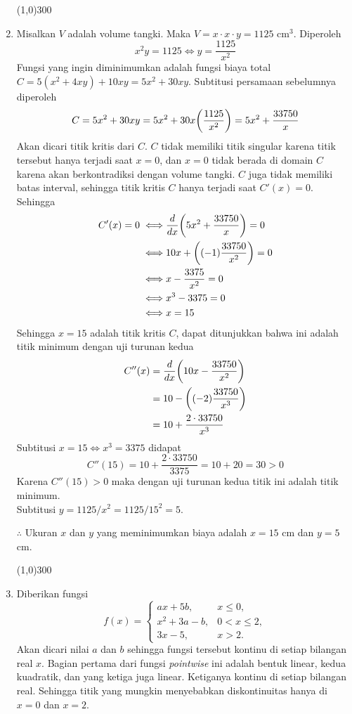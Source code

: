 \begin{enumerate}[leftmargin=*, label={\arabic*}.]
\begin{center}
    \line(1,0){300}
\end{center}
\item Misalkan $V$ adalah volume tangki. Maka $V = x \cdot x \cdot y = 1125$ cm$^{3}$.
Diperoleh
\[
x^{2}y = 1125 \iff y = \frac{1125}{x^{2}}
\]
Fungsi yang ingin diminimumkan adalah fungsi biaya total 
$C = 5(x^{2}+4xy)+10xy=5x^{2}+30xy$. Subtitusi persamaan sebelumnya diperoleh
\[
C = 5x^{2}+30xy = 5x^{2}+30x\brk*{\frac{1125}{x^{2}}} = 5x^{2}+\frac{33750}{x}
\]
Akan dicari titik kritis dari $C$. $C$ tidak memiliki titik singular karena titik 
tersebut hanya terjadi saat $x = 0$, dan $x=0$ tidak berada di domain $C$ karena akan 
berkontradiksi dengan volume tangki. $C$ juga tidak memiliki batas interval, sehingga titik 
kritis $C$ hanya terjadi saat $C'(x)=0$.
Sehingga
\begin{align*}
    C'(x) = 0 \iff &\drv{x}{5x^{2}+\frac{33750}{x}} = 0\\
    \iff & 10x+\brk*{(-1)\frac{33750}{x^{2}}} = 0\\
    \iff &x-\frac{3375}{x^{2}} = 0\\
    \iff &x^{3}-3375=0\\
    \iff &x = 15
\end{align*}
Sehingga $x=15$ adalah titik kritis $C$, dapat ditunjukkan bahwa ini adalah titik minimum 
dengan uji turunan kedua
\begin{align*}
    C''(x) &= \drv{x}{10x-\frac{33750}{x^{2}}}\\
    &= 10 - \brk*{(-2)\frac{33750}{x^{3}}}\\
    &= 10 + \frac{2\cdot 33750}{x^{3}}
\end{align*}
Subtitusi $x=15 \iff x^{3} = 3375$ didapat
\[
C''(15) = 10+\frac{2\cdot 33750}{3375} = 10 + 20 = 30 > 0
\]
Karena $C''(15)>0$ maka dengan uji turunan kedua titik ini adalah titik minimum.\\
Subtitusi $y = 1125/x^{2} = 1125/15^{2} = 5$.

$\therefore$ Ukuran $x$ dan $y$ yang meminimumkan biaya adalah $x=15$ cm dan $y=5$ cm.
\begin{center}
    \line(1,0){300}
\end{center}

\item Diberikan fungsi
\[
    f(x)=
    \begin{cases}
        ax+5b, &x \leq 0,\\
        x^2+3a-b, &0 < x \leq 2,\\
        3x-5, &x > 2.
    \end{cases}
\]
Akan dicari nilai $a$ dan $b$ sehingga fungsi tersebut kontinu di setiap bilangan real $x$.
Bagian pertama dari fungsi \textit{pointwise} ini adalah bentuk linear, kedua kuadratik, 
dan yang ketiga juga linear. Ketiganya kontinu di setiap bilangan real. 
Sehingga titik yang mungkin menyebabkan diskontinuitas hanya di $x=0$ dan $x=2$.


\end{enumerate}
